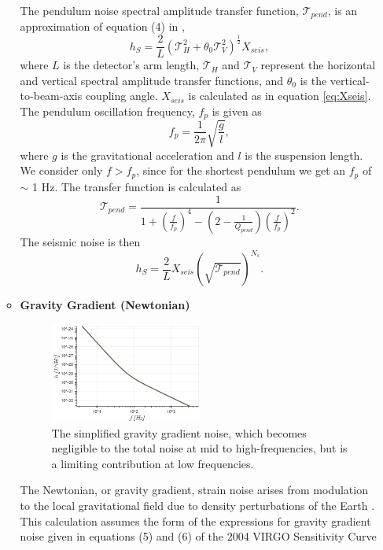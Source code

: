 \documentclass{article}
\begin{document}
\begin{itemize}
\begin{itemize}
    The pendulum noise spectral amplitude transfer function,
    $\mathcal{T}_{pend}$, is an approximation of equation (4) in
    \cite{VIRGO},
    \[
    h_{S} = \frac{2}{L}\left(\mathcal{T}_{H}^2 + \theta_0\mathcal{T}_V^2\right)^{\frac{1}{2}}X_{seis},
    \]
    where $L$ is the detector's arm length, $\mathcal{T}_H$ and
    $\mathcal{T}_V$ represent the horizontal and vertical spectral
    amplitude transfer functions, and $\theta_0$ is the
    vertical-to-beam-axis coupling angle. $X_{seis}$ is calculated as
    in equation \ref{eq:Xseis}.
    The pendulum oscillation frequency, $f_{p}$ is given as
    \[
    f_{p} = \frac{1}{2\pi}\sqrt{\frac{g}{l}} ,
    \] 
    where $g$ is the gravitational acceleration and $l$ is the
    suspension length. We consider only $f > f_p$, since for the
    shortest pendulum we get an $f_p$ of $\sim$ 1 Hz. The transfer
    function is calculated as
    \[
    \mathcal{T}_{pend} = \frac{1}{1 + \left(\frac{f}{f_{p}}\right)^4 - \left(2 - \frac{1}{Q_{pend}}\right)\left(\frac{f}{f_{p}}\right)^2}.
    \]
        The seismic noise is then
    \begin{equation}
        \label{eqn::seismic}
        h_{S} = \frac{2}{L}X_{seis}\left(\sqrt{\mathcal{T}_{pend}}\right)^{N_s}.
    \end{equation}
    \item \textbf{Gravity Gradient (Newtonian)} \\
    \begin{figure}[h!]
    \centering
    \includegraphics[width=0.5\textwidth]{SPQ_aLIGO_gravitygradient.png}
    \caption{The simplified gravity gradient noise, which becomes
      negligible to the total noise at mid to high-frequencies, but is
      a limiting contribution at low frequencies.}
    \label{fig:gravity}
    \end{figure}
    The Newtonian, or gravity gradient, strain noise arises from
    modulation to the local gravitational field due to density
    perturbations of the Earth \cite{advLIGO}. This calculation
    assumes the form of the expressions for gravity gradient noise
    given in equations (5) and (6) of the 2004 VIRGO Sensitivity Curve

\end{itemize}
\end{itemize}
\end{document}
